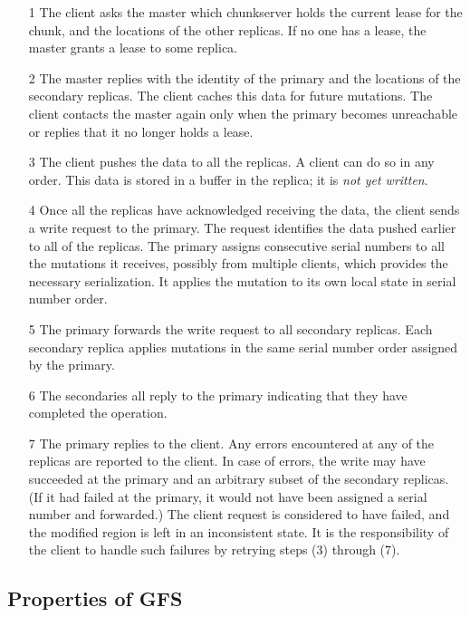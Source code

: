 \documentclass{article}
\begin{document}
\begin{itemize}
\item[1] The client asks the master which chunkserver holds the current lease for the chunk, and the locations of the other replicas. If no one has a lease, the master grants a lease to some replica.

\item[2] The master replies with the identity of the primary and the locations of the secondary replicas. The client caches this data for future mutations. The client contacts the master again only when the primary becomes unreachable or replies that it no longer holds a lease. 

\item[3] The client pushes the data to all the replicas. A client can do so in any order. This data is stored in a buffer in the replica; it is  \emph{not yet written}.

\item[4] Once all the replicas have acknowledged receiving the data, the client sends a write request to the primary. The request identifies the data pushed earlier to all of the replicas. The primary assigns consecutive serial numbers to all the mutations it receives, possibly from multiple clients, which provides the necessary serialization. It applies the mutation to its own local state in serial number order.

\item[5] The primary forwards the write request to all secondary replicas. Each secondary replica applies mutations in the same serial number order assigned by the primary.

\item[6] The secondaries all reply to the primary indicating that they have completed the operation.

\item[7] The primary replies to the client. Any errors encountered at any of the replicas are reported to the client.  In case of errors, the write may have succeeded at the primary and an arbitrary subset of the secondary replicas. (If it had failed at the primary, it would not have been assigned a serial number and forwarded.) The client request is considered to have failed, and the modified region is left in an inconsistent state. It is the responsibility of the client to handle such failures by retrying steps (3) through (7).
\end{itemize}

\subsection{Properties of GFS}
\end{document}
